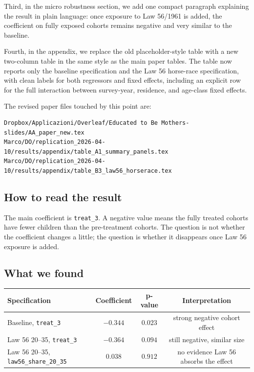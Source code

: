 \documentclass[11pt]{article}
\begin{document}
Third, in the micro robustness section, we add one compact paragraph explaining the result in plain language: once exposure to Law 56/1961 is added, the coefficient on fully exposed cohorts remains negative and very similar to the baseline.

Fourth, in the appendix, we replace the old placeholder-style table with a new two-column table in the same style as the main paper tables. The table now reports only the baseline specification and the Law 56 horse-race specification, with clean labels for both regressors and fixed effects, including an explicit row for the full interaction between survey-year, residence, and age-class fixed effects.

The revised paper files touched by this point are:

\begin{verbatim}
Dropbox/Applicazioni/Overleaf/Educated to Be Mothers-slides/AA_paper_new.tex
Marco/DO/replication_2026-04-10/results/appendix/table_A1_summary_panels.tex
Marco/DO/replication_2026-04-10/results/appendix/table_B3_law56_horserace.tex
\end{verbatim}

\subsection*{How to read the result}

The main coefficient is \texttt{treat\_3}. A negative value means the fully treated cohorts have fewer children than the pre-treatment cohorts. The question is not whether the coefficient changes a little; the question is whether it disappears once Law 56 exposure is added.

\subsection*{What we found}

\begin{center}
\begin{tabular}{lccc}
\toprule
Specification & Coefficient & p-value & Interpretation \\
\midrule
Baseline, \texttt{treat\_3} & $-0.344$ & $0.023$ & strong negative cohort effect \\
Law 56 20--35, \texttt{treat\_3} & $-0.364$ & $0.094$ & still negative, similar size \\
Law 56 20--35, \texttt{law56\_share\_20\_35} & $0.038$ & $0.912$ & no evidence Law 56 absorbs the effect \\
\bottomrule
\end{tabular}
\end{center}
\end{document}
